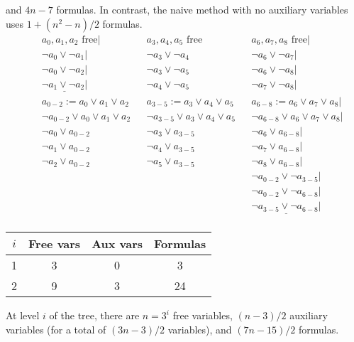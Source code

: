 \documentclass{article}
\begin{document}
and $4n-7$ formulas.
In contrast,
the naive method with no auxiliary variables
uses $1+(n^2-n)/2$ formulas.
\begin{align*}
  && a_0, a_1, a_2 \text{ free}|
  && a_3, a_4, a_5 \text{ free}
  && a_6, a_7, a_8 \text{ free}| \\
  && \lnot a_0 \lor \lnot a_1|
  && \lnot a_3 \lor \lnot a_4
  && \lnot a_6 \lor \lnot a_7| \\
  && \lnot a_0 \lor \lnot a_2|
  && \lnot a_3 \lor \lnot a_5
  && \lnot a_6 \lor \lnot a_8| \\
  && \underline{\lnot a_1 \lor \lnot a_2|}
  && \lnot a_4 \lor \lnot a_5
  && \lnot a_7 \lor \lnot a_8| \\
  && a_{0-2} := a_0 \lor a_1 \lor a_2
  && a_{3-5} := a_3 \lor a_4 \lor a_5
  && a_{6-8} := a_6 \lor a_7 \lor a_8| \\
  && \lnot a_{0-2} \lor a_0 \lor a_1 \lor a_2
  && \lnot a_{3-5} \lor a_3 \lor a_4 \lor a_5
  && \lnot a_{6-8} \lor a_6 \lor a_7 \lor a_8| \\
  && \lnot a_0 \lor a_{0-2}
  && \lnot a_3 \lor a_{3-5}
  && \lnot a_6 \lor a_{6-8}| \\
  && \lnot a_1 \lor a_{0-2}
  && \lnot a_4 \lor a_{3-5}
  && \lnot a_7 \lor a_{6-8}| \\
  && \lnot a_2 \lor a_{0-2}
  && \lnot a_5 \lor a_{3-5}
  && \lnot a_8 \lor a_{6-8}| \\
  && && && \lnot a_{0-2} \lor \lnot a_{3-5}| \\
  && && && \lnot a_{0-2} \lor \lnot a_{6-8}| \\
  && && && \underline{\lnot a_{3-5} \lor \lnot a_{6-8}|} \\
\end{align*}
\begin{center}
  \begin{tabular}{|c|c|c|c|}
    \hline
    $i$ & Free vars & Aux vars & Formulas \\ \hline
    1 & 3 & 0 & 3 \\ \hline
    2 & 9 & 3 & 24 \\ \hline
  \end{tabular}
\end{center}
At level $i$ of the tree,
there are $n=3^i$ free variables,
$(n-3)/2$ auxiliary variables
(for a total of $(3n-3)/2$ variables),
and $(7n-15)/2$ formulas.
\end{document}
